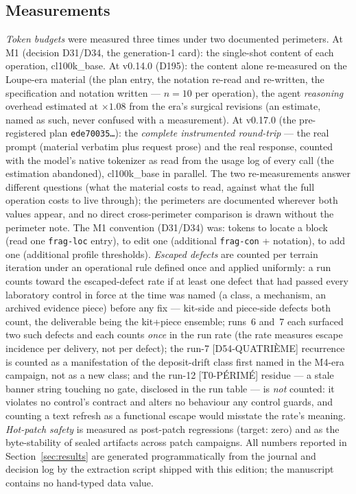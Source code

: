 \documentclass[11pt,a4paper]{article}
\newcommand{\code}[1]{\texttt{\small #1}}
\begin{document}
\subsection{Measurements}\label{sec:mesures}

\emph{Token budgets} were measured three times under two documented
perimeters. At M1 (decision D31/D34, the generation-1 card): the
single-shot content of each operation, cl100k\_base. At v0.14.0 (D195):
the content alone re-measured on the Loupe-era material (the plan entry,
the notation re-read and re-written, the specification and notation
written --- $n{=}10$ per operation), the agent \emph{reasoning} overhead
estimated at $\times 1.08$ from the era's surgical revisions (an
estimate, named as such, never confused with a measurement). At v0.17.0
(the pre-registered plan \code{ede70035\ldots}): the \emph{complete
instrumented round-trip} --- the real prompt (material verbatim plus
request prose) and the real response, counted with the model's native
tokenizer as read from the usage log of every call (the estimation
abandoned), cl100k\_base in parallel. The two re-measurements answer
different questions (what the material costs to read, against what the
full operation costs to live through); the perimeters are documented
wherever both values appear, and no direct cross-perimeter comparison
is drawn without the perimeter note. The M1 convention (D31/D34) was:
tokens to locate a block (read one \code{frag-loc} entry), to edit one
(additional \code{frag-con} + notation), to add one (additional
profile thresholds). \emph{Escaped defects} are counted per terrain
iteration under an operational rule defined once and applied uniformly:
a run counts toward the escaped-defect rate if at least one defect that
had passed every laboratory control in force at the time was named (a
class, a mechanism, an archived evidence piece) before any fix ---
kit-side and piece-side defects both count, the deliverable being the
kit+piece ensemble; runs~6 and~7 each surfaced two such defects and each
counts \emph{once} in the run rate (the rate measures escape incidence
per delivery, not per defect); the run-7 [D54-QUATRI\`EME] recurrence
is counted as a manifestation of the deposit-drift class first named in
the M4-era campaign, not as a new class; and the run-12 [T0-P\'ERIM\'E]
residue --- a stale banner string touching no gate, disclosed in the run
table --- is \emph{not} counted: it violates no control's contract and
alters no behaviour any control guards, and counting a text refresh as a
functional escape would misstate the rate's meaning.
\emph{Hot-patch safety} is measured as post-patch regressions (target:
zero) and as the byte-stability of sealed artifacts across patch
campaigns. All numbers reported in Section~\ref{sec:results} are
generated programmatically from the journal and decision log by the
extraction script shipped with this edition; the manuscript contains no
hand-typed data value.
\end{document}

